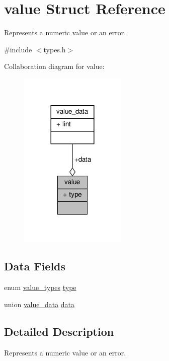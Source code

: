 \hypertarget{structvalue}{}\section{value Struct Reference}
\label{structvalue}


Represents a numeric value or an error.  




{\ttfamily \#include $<$types.\+h$>$}



Collaboration diagram for value\+:
\nopagebreak
\begin{figure}[H]
\begin{center}
\leavevmode
\includegraphics[width=144pt]{structvalue__coll__graph}
\end{center}
\end{figure}
\subsection*{Data Fields}
\begin{DoxyCompactItemize}
\item 
enum \hyperlink{types_8h_a2763ddd86ab6e5f5f4c34c0561d4cd39}{value\+\_\+types} \hyperlink{structvalue_a51293d8a9946f28f389010bf83820015}{type}
\item 
union \hyperlink{unionvalue__data}{value\+\_\+data} \hyperlink{structvalue_a7a505de18bdf859cc9246069c70c18b5}{data}
\end{DoxyCompactItemize}


\subsection{Detailed Description}
Represents a numeric value or an error. 

